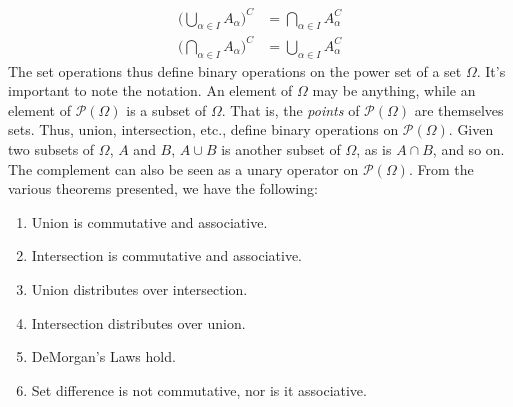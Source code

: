 \documentclass[crop=false,class=book,oneside]{standalone}
\begin{document}
            \begin{align}
                \Big(\bigcup_{\alpha\in{I}}A_{\alpha}\Big)^{C}
                &=\bigcap_{\alpha\in{I}}A_{\alpha}^{C}\\
                \Big(\bigcap_{\alpha\in{I}}A_{\alpha}\Big)^{C}
                &=\bigcup_{\alpha\in{I}}A_{\alpha}^{C}
            \end{align}
            The set operations thus define binary operations
            on the power set of a set $\Omega$. It's important
            to note the notation. An element of $\Omega$ may
            be anything, while an element of
            $\mathcal{P}(\Omega)$ is a subset of $\Omega$.
            That is, the \textit{points} of $\mathcal{P}(\Omega)$
            are themselves sets. Thus, union, intersection,
            etc., define binary operations on
            $\mathcal{P}(\Omega)$. Given two subsets of
            $\Omega$, $A$ and $B$, $A\cup{B}$ is another
            subset of $\Omega$, as is $A\cap{B}$, and so on.
            The complement can also be seen as a unary operator
            on $\mathcal{P}(\Omega)$. From the various theorems
            presented, we have the following:
            \begin{enumerate}
                \item Union is commutative and associative.
                \item Intersection is commutative and
                      associative.
                \item Union distributes over intersection.
                \item Intersection distributes over union.
                \item DeMorgan's Laws hold.
                \item Set difference is not commutative,
                      nor is it associative.
            \end{enumerate}
\end{document}
